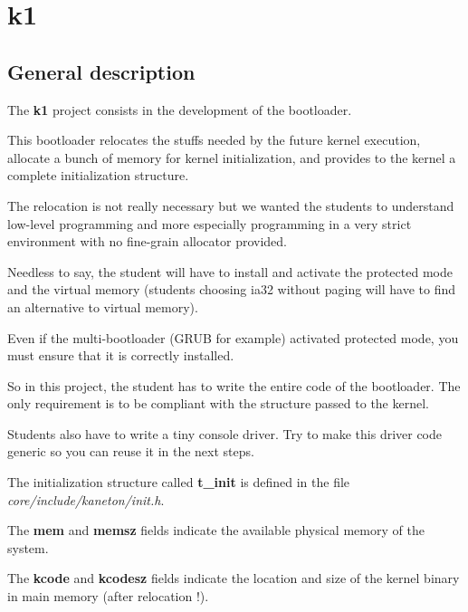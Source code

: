 
%
%

\section{k1}

\subsection{General description}

The \textbf{k1} project consists in the development of the bootloader.

This  bootloader relocates  the  stuffs needed  by  the future  kernel
execution, allocate  a bunch of memory for  kernel initialization, and
provides to the kernel a complete initialization structure.

The relocation is not really necessary but we wanted the students
to understand low-level programming and more especially programming
in a very strict environment with no fine-grain allocator provided.

Needless to  say, the  student will have  to install and  activate the
protected mode and the  virtual memory (students choosing ia32 without
paging will have to find an alternative to virtual memory).

Even if  the multi-bootloader  (GRUB for example)  activated protected
mode, you must ensure that it is correctly installed.

So in this project, the student has to write the entire code of the
bootloader. The only requirement is to be compliant with the structure
passed to the kernel.

Students also  have to write a  tiny console driver. Try  to make this
driver code generic so you can reuse it in the next steps.

The initialization structure called \textbf{t\_init} is defined in the
file \textit{core/include/kaneton/init.h}.

The \textbf{mem} and \textbf{memsz} fields indicate the available physical
memory of the system.

The \textbf{kcode} and \textbf{kcodesz} fields indicate the location and
size of the kernel binary in main memory (after relocation !).

